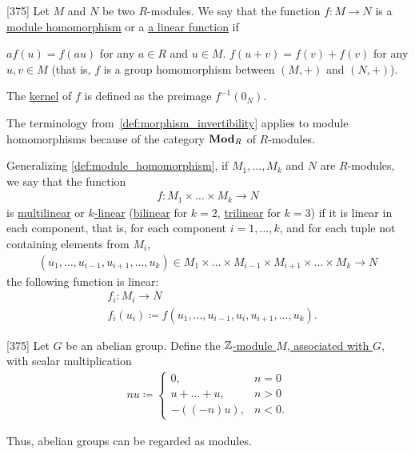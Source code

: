 \begin{definition}\label{def:module_homomorphism}\cite{Knapp2016BAlg}[375]
  Let $M$ and $N$ be two $R$-modules. We say that the function $f: M \to N$ is a \uline{module homomorphism} or a \uline{a linear function} if
  \begin{description}
     $a f(u) = f(a u)$ for any $a \in R$ and $u \in M$.
     $f(u + v) = f(v) + f(v)$ for any $u, v \in M$ (that is, $f$ is a group homomorphism between $(M, +)$ and $(N, +)$).
  \end{description}

  The \uline{kernel} of $f$ is defined as the preimage $f^{-1}(0_N)$.

  The terminology from~\cref{def:morphism_invertibility} applies to module homomorphisms because of the category $\operatorname{\mathbf{Mod}}_R$ of $R$-modules.
\end{definition}

\begin{definition}\label{def:multilinear_function}
  Generalizing \cref{def:module_homomorphism}, if $M_1, \ldots, M_k$ and $N$ are $R$-modules, we say that the function
  \begin{align*}
    f: M_1 \times \ldots \times M_k \to N
  \end{align*}
  is \uline{multilinear} or \uline{$k$-linear} (\uline{bilinear} for $k = 2$, \uline{trilinear} for $k = 3$) if it is linear in each component, that is, for each component $i = 1, \ldots, k$, and for each tuple not containing elements from $M_i$,
  \begin{align*}
    (u_1, \ldots, u_{i-1}, u_{i+1}, \ldots, u_k) \in M_1 \times \ldots \times M_{i-1} \times M_{i+1} \times \ldots \times M_k \to N
  \end{align*}
  the following function is linear:
  \begin{align*}
    &f_i: M_i \to N \\
    &f_i(u_i) \coloneqq f(u_1, \ldots, u_{i-1}, u_i, u_{i+1}, \ldots, u_k).
  \end{align*}
\end{definition}

\begin{definition}\label{def:abelian_group_z_module}\cite{Knapp2016BAlg}[375]
  Let $G$ be an abelian group. Define the \uline{$\mathbb Z$-module $M$, associated with $G$}, with scalar multiplication
  \begin{align*}
    nu \coloneqq \begin{cases}
      0, &n = 0 \\
      u + \ldots + u, &n > 0 \\
      -((-n)u), &n < 0.
    \end{cases}
  \end{align*}

  Thus, abelian groups can be regarded as modules.
\end{definition}

